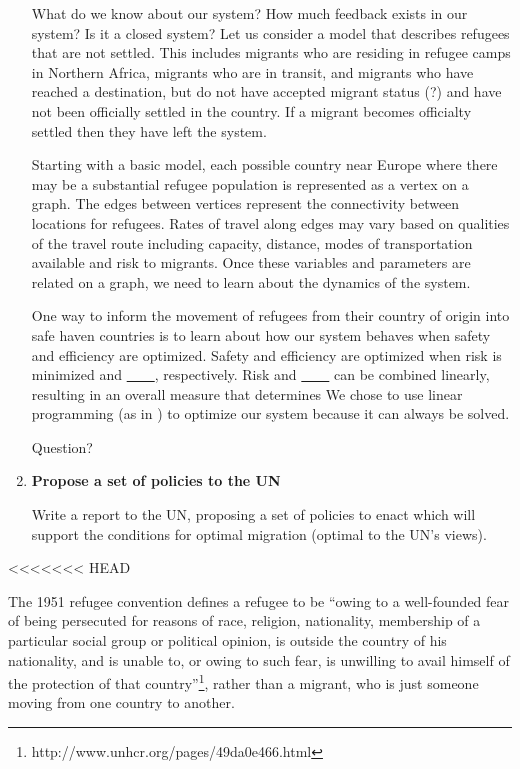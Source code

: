 \documentclass{article}
\begin{document}
\begin{enumerate}
    What do we know about our system?
    How much feedback exists in our system? Is it a closed system? 
    Let us consider a model that describes refugees that are not settled. This includes migrants who are residing in refugee camps in Northern Africa, migrants who are in transit, and migrants who have reached a destination, but do not have accepted migrant status (?) and have not been officially settled in the country. If a migrant becomes officialty settled then they have left the system. 

    Starting with a basic model, each possible country near Europe where there may be a substantial refugee population is represented as a vertex on a graph. The edges between vertices represent the connectivity between locations for refugees. Rates of travel along edges may vary based on qualities of the travel route including capacity, distance, modes of transportation available and risk to migrants. Once these variables and parameters are related on a graph, we need to learn about the dynamics of the system.


    One way to inform the movement of refugees from their country of origin into safe haven countries is to learn about how our system behaves when safety and efficiency are optimized. Safety and efficiency are optimized when risk is minimized and \underline{\ \ \ \ }, respectively. Risk and \underline{\ \ \ \ } can be combined linearly, resulting in an overall measure that determines We chose to use linear programming (as in \cite{bertsekas}) to optimize our system because it can always be solved. 

    Question?

    \item {\bf Propose a set of policies to the UN}

    Write a report to the UN, proposing a set of policies to enact which will support the conditions for optimal migration (optimal to the UN's views).
\end{enumerate}
<<<<<<< HEAD

The 1951 refugee convention defines a refugee to be ``owing to a well-founded fear of being persecuted for reasons of race, religion, nationality, membership of a particular social group or political opinion, is outside the country of his nationality, and is unable to, or owing to such fear, is unwilling to avail himself of the protection of that country''\footnote{http://www.unhcr.org/pages/49da0e466.html}, rather than a migrant, who is just someone moving from one country to another.
\end{document}
